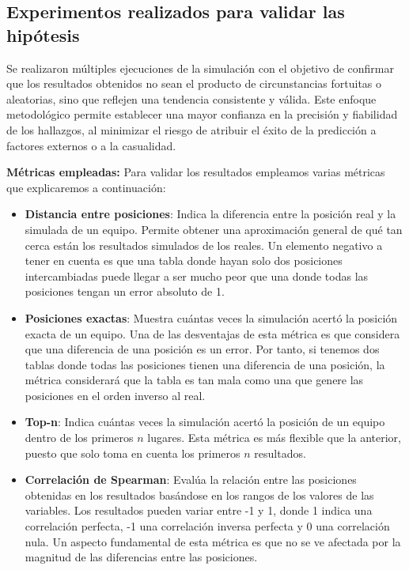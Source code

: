 \documentclass{article}
\begin{document}
        \subsection{Experimentos realizados para validar las hipótesis}
            Se realizaron múltiples ejecuciones de la simulación con el objetivo de confirmar que los resultados obtenidos no sean el producto de circunstancias fortuitas o aleatorias, sino que reflejen una tendencia consistente y válida. Este enfoque metodológico permite establecer una mayor confianza en la precisión y fiabilidad de los hallazgos, al minimizar el riesgo de atribuir el éxito de la predicción a factores externos o a la casualidad.

            \textbf{Métricas empleadas:}
            Para validar los resultados empleamos varias métricas que explicaremos a continuación:

            \begin{itemize}
                \item \textbf{Distancia entre posiciones}: Indica la diferencia entre la posición real y la simulada de un equipo. Permite obtener una aproximación general de qué tan cerca están los resultados simulados de los reales. Un elemento negativo a tener en cuenta es que una tabla donde hayan solo dos posiciones intercambiadas puede llegar a ser mucho peor que una donde todas las posiciones tengan un error absoluto de 1.
                \item \textbf{Posiciones exactas}: Muestra cuántas veces la simulación acertó la posición exacta de un equipo. Una de las desventajas de esta métrica es que considera que una diferencia de una posición es un error. Por tanto, si tenemos dos tablas donde todas las posiciones tienen una diferencia de una posición, la métrica considerará que la tabla es tan mala como una que genere las posiciones en el orden inverso al real.
                \item \textbf{Top-n}: Indica cuántas veces la simulación acertó la posición de un equipo dentro de los primeros $n$ lugares. Esta métrica es más flexible que la anterior, puesto que solo toma en cuenta los primeros $n$ resultados.
                \item \textbf{Correlación de Spearman}: Evalúa la relación entre las posiciones obtenidas en los resultados basándose en los rangos de los valores de las variables. Los resultados pueden variar entre -1 y 1, donde 1 indica una correlación perfecta, -1 una correlación inversa perfecta y 0 una correlación nula. Un aspecto fundamental de esta métrica es que no se ve afectada por la magnitud de las diferencias entre las posiciones.                
            \end{itemize} 
\end{document}
